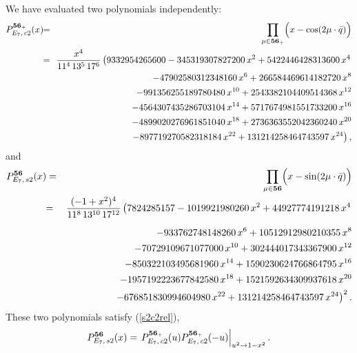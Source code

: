\documentclass[a4paper,12pt]{article}
\newcommand{\vT}{\vphantom{\mbox{\twozero I}}}
\begin{document}
We have evaluated two polynomials independently:
\begin{eqnarray}
   P_{E_7,\,c2}^{{\bf 56}_+}(x)&\!\!=\!\!&\prod_{\mu\in{\bf 56}_+}
   \Bigl(x-\cos(2\mu\cdot\bar{q})\Bigr)\nonumber\\
%
   &\!\!=\!\!&{x^4\over{11^4\,13^5\,17^6}}\left(
   9332954265600 - 345319307827200\,x^2 +
    5422446428313600\,x^4\right.\nonumber\\
   &&\qquad\quad  - 47902580312348160\,x^6 +
    266584469614182720\,x^8\nonumber\\
   &&\qquad\quad  - 991356255189780480\,x^{10} +
    2543382104409514368\,x^{12}\nonumber\\
   &&\qquad\quad  -
    4564307435286703104\,x^{14} +
    5717674981551733200\,x^{16}\nonumber\\
   &&\qquad\quad  -
    4899020276961851040\,x^{18} +
    2736363552042360240\,x^{20}\nonumber\\
   &&\left.\qquad\quad  - 897719270582318184\,x^{22} +
    131214258464743597\,x^{24}\right),
\end{eqnarray}
and
\begin{eqnarray}
   P_{E_7,\,s2}^{{\bf 56}}(x)&=&\prod_{\mu\in{\bf 56}}
   \Bigl(x-\sin(2\mu\cdot\bar{q})\Bigr)\nonumber\\
%
   &\!\!=\!\!&{(-1 + x^2)^4\over{11^{8}\,13^{10}\,17^{12}}}\left(7824285157 -
   1019921980260\,x^2 +
          44927774191218\,x^4\right.\nonumber\\[6pt]
   &&\qquad\qquad  - 933762748148260\,x^6 + 10512912980210355\,x^8\nonumber\\
   &&\qquad\qquad   -
          70729109671077000\,x^{10} + 302444017343367900\,x^{12}\nonumber\\
   &&\qquad\qquad   -
          850322103495681960\,x^{14} + 1590230624766864795\,x^{16}\nonumber\\
   &&\qquad\qquad   -
          1957192223677842580\,x^{18} + 1521592634309937618\,x^{20}\nonumber\\
   &&\qquad\qquad  \left. -
          676851830994604980\,x^{22} + 131214258464743597\,x^{24}\right)^2.
\end{eqnarray}
These two polynomials satisfy (\ref{s2c2rel}),
\begin{equation}
   P_{E_7,\,s2}^{{\bf 56}}(x)=
   \left.\vT P_{E_7,\,c2}^{{\bf 56}_+}(u)P_{E_7,\,c2}^{{\bf 56}_+}(-u)
   \right|_{u^2\to1-x^2}.
\end{equation}

\end{document}
